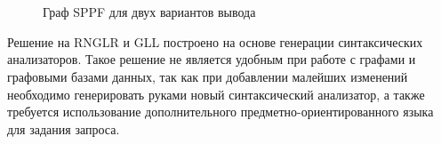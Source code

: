  \begin{figure}[t]
 \centering

    ~\\~
 \caption{Граф SPPF для двух вариантов вывода}
\end{figure}

Решение на RNGLR и GLL построено на основе генерации синтаксических анализаторов. Такое решение не является удобным при работе с графами и графовыми базами данных, так как при добавлении малейших изменений необходимо генерировать руками новый синтаксический анализатор, а также требуется использование дополнительного предметно-ориентированного языка для задания запроса. 

